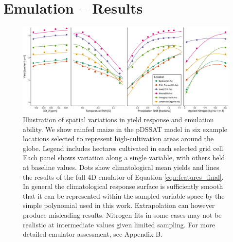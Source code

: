 \documentclass[gmd, manuscript]{copernicus} %
\begin{document}
\section{Emulation -- Results}
\label{S:5}

\begin{figure}[ht]
\centering
    \includegraphics[width=16cm]{figures/regression_areas.png}
    \caption{Illustration of spatial variations in yield response and emulation ability. We show rainfed maize in the pDSSAT model in six example locations selected to represent high-cultivation areas around the globe. Legend includes hectares cultivated in each selected grid cell. Each panel shows variation along a single variable, with others held at baseline values. Dots show climatological mean yields and lines the results of the full 4D emulator of Equation \ref{eqn:features_final}. In general the climatological response surface is sufficiently smooth that it can be represented within the sampled variable space by the simple polynomial used in this work. Extrapolation can however produce misleading results. Nitrogen fits in some cases may not be realistic at intermediate values given limited sampling. For more detailed emulator assessment, see Appendix B.}
   \label{fig:regression}
\end{figure}
\end{document}
